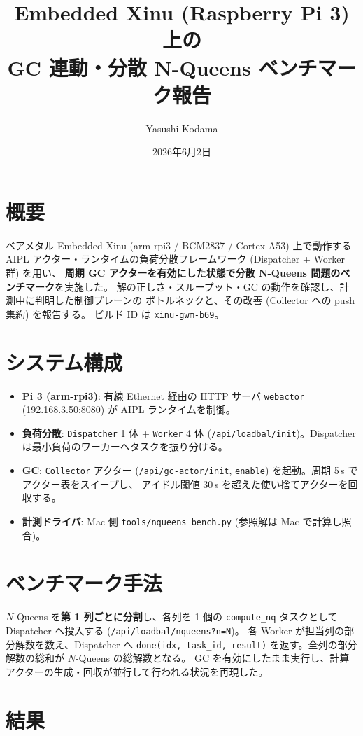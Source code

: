 \documentclass[a4paper,11pt]{ltjsarticle}
\title{Embedded Xinu (Raspberry Pi 3) 上の\\GC 連動・分散 N-Queens ベンチマーク報告}
\author{Yasushi Kodama}
\date{2026年6月2日}
\begin{document}
\maketitle

\section{概要}
ベアメタル Embedded Xinu (arm-rpi3 / BCM2837 / Cortex-A53) 上で動作する
AIPL アクター・ランタイムの負荷分散フレームワーク (Dispatcher + Worker 群) を用い、
\textbf{周期 GC アクターを有効にした状態で分散 N-Queens 問題のベンチマーク}を実施した。
解の正しさ・スループット・GC の動作を確認し、計測中に判明した制御プレーンの
ボトルネックと、その改善 (Collector への push 集約) を報告する。
ビルド ID は \texttt{xinu-gwm-b69}。

\section{システム構成}
\begin{itemize}
  \item \textbf{Pi 3 (arm-rpi3)}: 有線 Ethernet 経由の HTTP サーバ \texttt{webactor}
        (192.168.3.50:8080) が AIPL ランタイムを制御。
  \item \textbf{負荷分散}: \texttt{Dispatcher} 1 体 + \texttt{Worker} 4 体
        (\texttt{/api/loadbal/init})。Dispatcher は最小負荷のワーカーへタスクを振り分ける。
  \item \textbf{GC}: \texttt{Collector} アクター (\texttt{/api/gc-actor/init},
        \texttt{enable}) を起動。周期 5\,s でアクター表をスイープし、
        アイドル閾値 30\,s を超えた使い捨てアクターを回収する。
  \item \textbf{計測ドライバ}: Mac 側 \texttt{tools/nqueens\_bench.py}
        (参照解は Mac で計算し照合)。
\end{itemize}

\section{ベンチマーク手法}
$N$-Queens を\textbf{第 1 列ごとに分割}し、各列を 1 個の \texttt{compute\_nq}
タスクとして Dispatcher へ投入する (\texttt{/api/loadbal/nqueens?n=N})。
各 Worker が担当列の部分解数を数え、Dispatcher へ \texttt{done(idx, task\_id, result)}
を返す。全列の部分解数の総和が $N$-Queens の総解数となる。
GC を有効にしたまま実行し、計算アクターの生成・回収が並行して行われる状況を再現した。

\section{結果}
\end{document}
